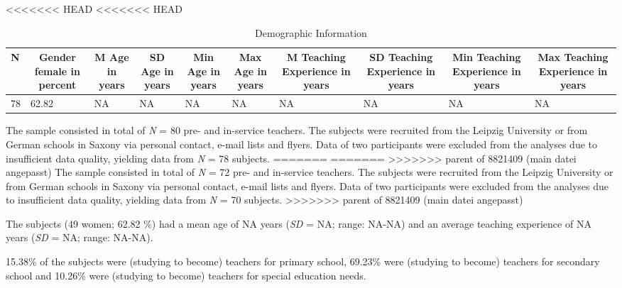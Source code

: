 \documentclass[
  man,floatsintext]{apa6}
\begin{document}
<<<<<<< HEAD
<<<<<<< HEAD
\begin{table}[h]

\begin{center}
\begin{threeparttable}

\caption{\label{tab:demographicstable}Demographic Information}

\tiny{

\begin{tabular}{llllllllll}
\toprule
N & \multicolumn{1}{c}{Gender female in percent} & \multicolumn{1}{c}{M Age in years} & \multicolumn{1}{c}{SD Age in years} & \multicolumn{1}{c}{Min Age in years} & \multicolumn{1}{c}{Max Age in years} & \multicolumn{1}{c}{M Teaching Experience in years} & \multicolumn{1}{c}{SD Teaching Experience in years} & \multicolumn{1}{c}{Min Teaching Experience in years} & \multicolumn{1}{c}{Max Teaching Experience in years}\\
\midrule
78 & 62.82 & NA & NA & NA & NA & NA & NA & NA & NA\\
\bottomrule
\end{tabular}

}

\end{threeparttable}
\end{center}

\end{table}

The sample consisted in total of \emph{N} = 80 pre- and in-service teachers. The subjects were recruited from the Leipzig University or from German schools in Saxony via personal contact, e-mail lists and flyers. Data of two participants were excluded from the analyses due to insufficient data quality, yielding data from \emph{N} = 78 subjects.
=======
=======
>>>>>>> parent of 8821409 (main datei angepasst)
The sample consisted in total of \emph{N} = 72 pre- and in-service teachers. The subjects were recruited from the Leipzig University or from German schools in Saxony via personal contact, e-mail lists and flyers. Data of two participants were excluded from the analyses due to insufficient data quality, yielding data from \emph{N} = 70 subjects.
>>>>>>> parent of 8821409 (main datei angepasst)

The subjects (49 women; 62.82 \%) had a mean age of NA years (\emph{SD} = NA; range: NA-NA) and an average teaching experience of NA years (\emph{SD} = NA; range: NA-NA).

15.38\% of the subjects were (studying to become) teachers for primary school, 69.23\% were (studying to become) teachers for secondary school and 10.26\% were (studying to become) teachers for special education needs.
\end{document}
